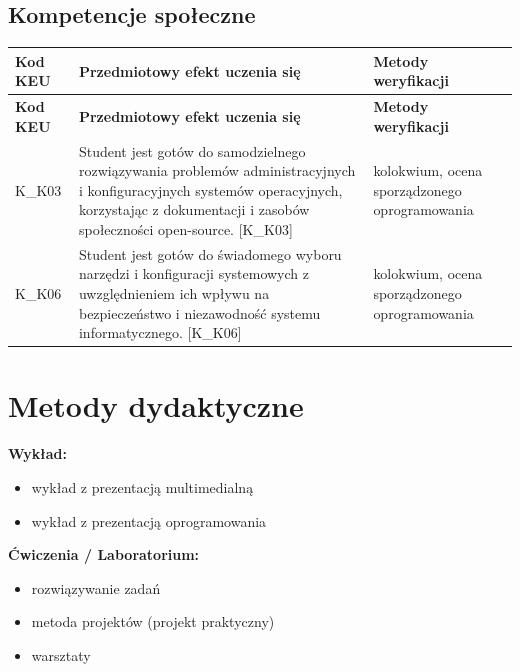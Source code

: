 \documentclass[12pt, a4paper]{article}
\newcommand{\thdrule}{\noalign{\global\setlength{\extrarowheight}{0pt}}}
\newcommand{\thdend}{\noalign{\global\setlength{\extrarowheight}{3pt}}}
\begin{document}
\subsection*{Kompetencje społeczne}
{\scriptsize
\begin{longtable}{m{1.6cm}m{9.0cm}m{4.2cm}}
\thdrule\toprule
\rowcolor{pjatkRed} {\color{white}\footnotesize\textbf{\vphantom{Ag}Kod KEU}} & {\color{white}\footnotesize\textbf{\vphantom{Ag}Przedmiotowy efekt uczenia się}} & {\color{white}\footnotesize\textbf{\vphantom{Ag}Metody weryfikacji}} \\
\midrule\thdend
\endfirsthead
\thdrule\toprule
\rowcolor{pjatkRed} {\color{white}\footnotesize\textbf{\vphantom{Ag}Kod KEU}} & {\color{white}\footnotesize\textbf{\vphantom{Ag}Przedmiotowy efekt uczenia się}} & {\color{white}\footnotesize\textbf{\vphantom{Ag}Metody weryfikacji}} \\
\midrule\thdend
\endhead
  \rowcolor{tableRowLight} K\_K03 & Student jest gotów do samodzielnego rozwiązywania problemów administracyjnych i konfiguracyjnych systemów operacyjnych, korzystając z dokumentacji i zasobów społeczności open-source. {[}K\_K03{]} & kolokwium, ocena sporządzonego oprogramowania \\
  \rowcolor{tableRowAlt} K\_K06 & Student jest gotów do świadomego wyboru narzędzi i konfiguracji systemowych z uwzględnieniem ich wpływu na bezpieczeństwo i niezawodność systemu informatycznego. {[}K\_K06{]} & kolokwium, ocena sporządzonego oprogramowania \\
\bottomrule
\end{longtable}}

\section{Metody dydaktyczne}

\textbf{Wykład:}
\begin{itemize}
  \item wykład z prezentacją multimedialną
  \item wykład z prezentacją oprogramowania
\end{itemize}
\vspace{4pt}
\textbf{Ćwiczenia / Laboratorium:}
\begin{itemize}
  \item rozwiązywanie zadań
  \item metoda projektów (projekt praktyczny)
  \item warsztaty
\end{itemize}
\vspace{4pt}
\end{document}
